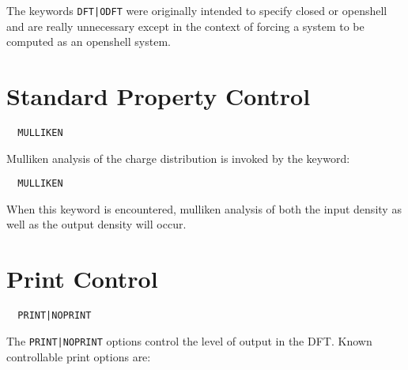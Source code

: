 The keywords \verb+DFT|ODFT+ were originally intended to specify
closed or openshell and are really unnecessary except in the context of
forcing a system to be computed as an openshell system.

\section{Standard Property Control}
\begin{verbatim}
  MULLIKEN
\end{verbatim}

Mulliken analysis of the charge distribution is invoked by the keyword:
\begin{verbatim}
  MULLIKEN
\end{verbatim}

When this keyword is encountered, mulliken analysis of both the input 
density as well as the output density will occur.


\section{Print Control}
\begin{verbatim}
  PRINT|NOPRINT
\end{verbatim}

The \verb+PRINT|NOPRINT+ options control the level of output in the
DFT.  Known controllable print options are:



